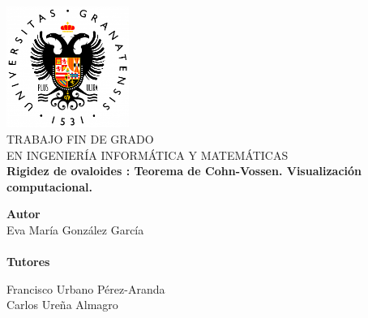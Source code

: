\begin{titlepage}
 
 
\newlength{\centeroffset}
\setlength{\centeroffset}{-0.5\oddsidemargin}
\addtolength{\centeroffset}{0.5\evensidemargin}
\thispagestyle{empty}

\noindent\hspace*{\centeroffset}\begin{minipage}{\textwidth}

\centering
\includegraphics[width=0.3\textwidth]{imagenes/logougr_new.png}\\[1.4cm]

\textsc{ \Large TRABAJO FIN DE GRADO\\[0.2cm]}
\textsc{ EN INGENIERÍA INFORMÁTICA Y MATEMÁTICAS }\\[1cm]

% 
{\Huge\bfseries Rigidez de ovaloides : Teorema de Cohn-Vossen. Visualización computacional.\\
}
\end{minipage}

\vspace{2.5cm}
\noindent\hspace*{\centeroffset}\begin{minipage}{\textwidth}
\centering

\textbf{Autor}\\ {Eva María González García}\\[2.5ex]
${ }$\\
\textbf{Tutores}\\
\begin{multicols}{2}
		Francisco Urbano Pérez-Aranda\\
		\columnbreak
Carlos Ureña Almagro
\end{multicols}%

${ }$\\
\begin{multicols}{2}%
           

\end{multicols}
\end{minipage}
\end{titlepage}
